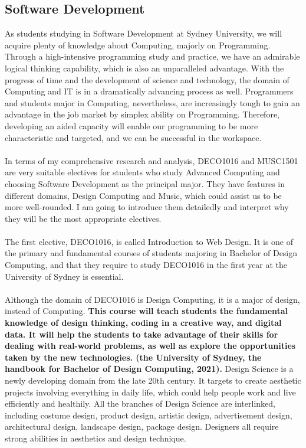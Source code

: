 \documentclass{article}
\begin{document}
	\subsection{Software Development}
	As students studying in Software Development at Sydney University, we will acquire plenty of knowledge about Computing, majorly on Programming. Through a high-intensive programming study and practice, we have an admirable logical thinking capability, which is also an unparalleled advantage. With the progress of time and the development of science and technology, the domain of Computing and IT is in a dramatically advancing process as well. Programmers and students major in Computing, nevertheless, are increasingly tough to gain an advantage in the job market by simplex ability on Programming. Therefore, developing an aided capacity will enable our programming to be more characteristic and targeted, and we can be successful in the workspace. \\
	\\
	In terms of my comprehensive research and analysis, DECO1016 and MUSC1501 are very suitable electives for students who study Advanced Computing and choosing Software Development as the principal major. They have features in different domains, Design Computing and Music, which could assist us to be more well-rounded. I am going to introduce them detailedly and interpret why they will be the most appropriate electives.\\
	\\
	The first elective, DECO1016, is called Introduction to Web Design. It is one of the primary and fundamental courses of students majoring in Bachelor of Design Computing, and that they require to study DECO1016 in the first year at the University of Sydney is essential.\\
	\\
	Although the domain of DECO1016 is Design Computing, it is a major of design, instead of Computing. \textbf{This course will teach students the fundamental knowledge of design thinking, coding in a creative way, and digital data. It will help the students to take advantage of their skills for dealing with real-world problems, as well as explore the opportunities taken by the new technologies. (the University of Sydney, the handbook for Bachelor of Design Computing, 2021).} Design Science is a newly developing domain from the late 20th century. It targets to create aesthetic projects involving everything in daily life, which could help people work and live efficiently and healthily. All the branches of Design Science are interlinked, including costume design, product design, artistic design, advertisement design, architectural design, landscape design, package design. Designers all require strong abilities in aesthetics and design technique.\\
\end{document}
